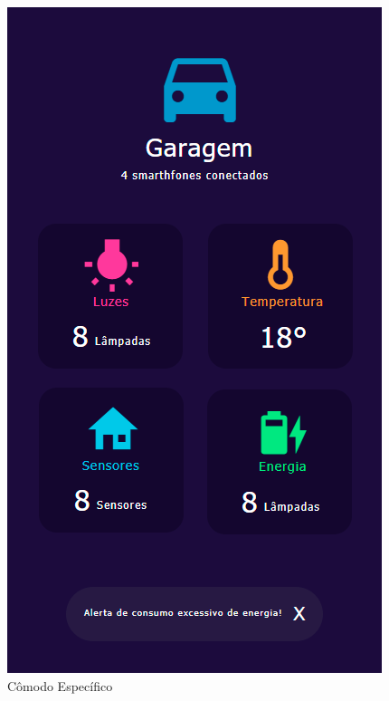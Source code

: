                 \graphicspath{ {figuras/} }
                \begin{figure}[h]
                    \centering
                    \includegraphics[scale=0.35]{3}
                    \caption{Cômodo Específico}
                    \label{fig:comodo}
                \end{figure}
